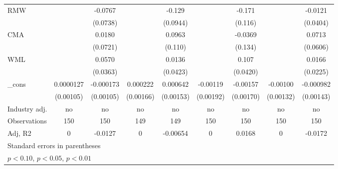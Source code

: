 {\begin{tabular}{l*{8}{c}}
RMW                 &                     &     -0.0767         &                     &      -0.129         &                     &      -0.171         &                     &     -0.0121         \\
                    &                     &    (0.0738)         &                     &    (0.0944)         &                     &     (0.116)         &                     &    (0.0404)         \\
CMA                 &                     &      0.0180         &                     &      0.0963         &                     &     -0.0369         &                     &      0.0713         \\
                    &                     &    (0.0721)         &                     &     (0.110)         &                     &     (0.134)         &                     &    (0.0606)         \\
WML                 &                     &      0.0570         &                     &      0.0136         &                     &       0.107\sym{**} &                     &      0.0166         \\
                    &                     &    (0.0363)         &                     &    (0.0423)         &                     &    (0.0420)         &                     &    (0.0225)         \\
\_cons              &   0.0000127         &   -0.000173         &    0.000222         &    0.000642         &    -0.00119         &    -0.00157         &    -0.00100         &   -0.000982         \\
                    &   (0.00105)         &   (0.00105)         &   (0.00166)         &   (0.00153)         &   (0.00192)         &   (0.00170)         &   (0.00132)         &   (0.00143)         \\
\hline
Industry adj.       &          no         &          no         &          no         &          no         &          no         &          no         &          no         &          no         \\
Observations        &         150         &         150         &         149         &         149         &         150         &         150         &         150         &         150         \\
Adj, R2             &           0         &     -0.0127         &           0         &    -0.00654         &           0         &      0.0168         &           0         &     -0.0172         \\
\hline\hline
\multicolumn{9}{l}{\footnotesize Standard errors in parentheses}\\
\multicolumn{9}{l}{\footnotesize \sym{*} \(p<0.10\), \sym{**} \(p<0.05\), \sym{***} \(p<0.01\)}\\
\end{tabular}
}
